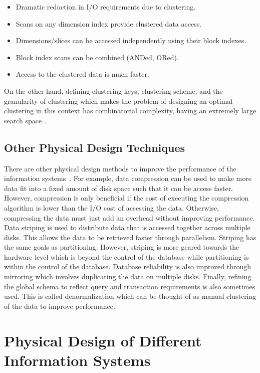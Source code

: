 \documentclass[12pt,a4paper]{article}
\begin{document}
\begin{itemize}
 \item Dramatic reduction in I/O requirements due to clustering.
 \item Scans on any dimension index provide clustered data access.
 \item Dimensions/slices can be accessed independently using their block indexes.
 \item Block index scans can be combined (ANDed, ORed).
 \item Access to the clustered data is much faster.
\end{itemize}

On the other hand, defining clustering keys, clustering scheme, and the granularity of clustering which makes the problem of designing an optimal clustering in
this context has combinatorial complexity, having an extremely large search space \cite{jagadish1999snakes}.

\subsection{Other Physical Design Techniques}

There are other physical design methods to improve the performance of the information systems~\cite{lightstone2007physical}. For example, data compression can
be used to make more data fit into a fixed amount of disk space such that it can be access faster. However, compression is only beneficial if the cost of
executing the compression algorithm is lower than the I/O cost of accessing the data. Otherwise, compressing the data must just add an overhead without
improving performance. Data striping is used to distribute data that is accessed together across multiple disks. This allows the data
to be retrieved faster through parallelism. Striping has the same goals as partitioning. However, striping is more geared towards the hardware level
which is beyond the control of the database while partitioning is within the control of the database. Database reliability is also improved through mirroring
which involves duplicating the data on multiple disks. Finally, refining the global schema to reflect query and transaction requirements is also sometimes used.
This is called denormalization which can be thought of as manual clustering of the data to improve performance.

\section{Physical Design of Different Information Systems}
\label{SEC-DIFFSYS}
\end{document}

